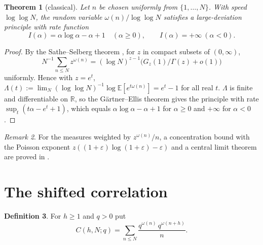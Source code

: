 \documentclass[11pt]{amsart}
\newtheorem{theorem}{Theorem}[section]
\theoremstyle{definition}
\newtheorem{definition}[theorem]{Definition}
\theoremstyle{remark}
\newtheorem{remark}[theorem]{Remark}
\newcommand{\om}{\omega}
\begin{document}
\begin{theorem}[classical]\label{thm:LD}
  Let $n$ be chosen uniformly from $\{1,\dots,N\}$.  With speed $\log\log N$, the random
  variable $\om(n)/\log\log N$ satisfies a large-deviation principle with rate function
  \[
    I(\alpha) = \alpha\log\alpha - \alpha + 1\quad(\alpha\ge0),\qquad I(\alpha)=+\infty\ (\alpha<0).
  \]
\end{theorem}
\begin{proof}
  By the Sathe--Selberg theorem \cite[Ch.~II.6]{SD}, for $z$ in compact subsets of
  $(0,\infty)$,
  \[
    N^{-1}\sum_{n\le N}z^{\om(n)}=(\log N)^{z-1}\bigl(G_z(1)/\Gamma(z)+o(1)\bigr)
  \]
  uniformly.  Hence with $z=e^t$,
  $\Lambda(t):=\lim_N(\log\log N)^{-1}\log\mathbb E[e^{t\om(n)}]=e^t-1$ for all real $t$.
  $\Lambda$ is finite and differentiable on $\mathbb R$, so the G\"artner--Ellis theorem
  gives the principle with rate $\sup_t(t\alpha-e^t+1)$, which equals
  $\alpha\log\alpha-\alpha+1$ for $\alpha\ge0$ and $+\infty$ for $\alpha<0$.
\end{proof}

\begin{remark}
  For the measures weighted by $z^{\om(n)}/n$, a concentration bound with the Poisson
  exponent $z((1+\varepsilon)\log(1+\varepsilon)-\varepsilon)$ and a central limit theorem
  are proved in \cite[Thm.~5.1]{P05}.
\end{remark}

\section{The shifted correlation}
\label{sec:error}

\begin{definition}
  For $h\ge 1$ and $q>0$ put
  \[
    C(h,N;q) = \sum_{n\le N}\frac{q^{\om(n)}\,q^{\om(n+h)}}{n}.
  \]
\end{definition}
\end{document}
